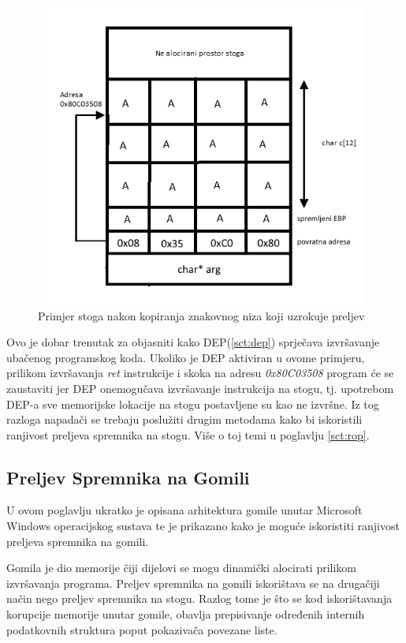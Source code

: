 \documentclass[times, utf8, diplomski, numeric]{fer}
\begin{document}
\begin{figure}[!ht]
\centering
\setlength\fboxsep{0pt}
\setlength\fboxrule{0.5pt}
\includegraphics[width=12cm, height=10cm]{slike/buffer_overflow_overflow}
\caption{Primjer stoga nakon kopiranja znakovnog niza koji uzrokuje preljev}
\label{fig:buff_overflow_overflow} 
\end{figure}
Ovo je dobar trenutak za objasniti kako DEP(\ref{sct:dep}) sprječava izvršavanje ubačenog programskog koda. Ukoliko je DEP aktiviran u ovome primjeru, prilikom izvršavanja \emph{ret} instrukcije i skoka na adresu \emph{0x80C03508} program će se zaustaviti jer DEP onemogučava izvršavanje instrukcija na stogu, tj. upotrebom DEP-a sve memorijske lokacije na stogu postavljene su kao ne izvršne. Iz tog razloga napadači se trebaju poslužiti drugim metodama kako bi iskoristili ranjivost preljeva spremnika na stogu. Više o toj temi u poglavlju \ref{sct:rop}.

\subsection{Preljev Spremnika na Gomili}
\label{scr:heap_overflow}
U ovom poglavlju ukratko je opisana arhitektura gomile unutar Microsoft Windows operacijskog sustava te je prikazano kako je moguće iskoristiti ranjivost preljeva spremnika na gomili.

Gomila je dio memorije čiji dijelovi se mogu dinamički alocirati prilikom izvršavanja programa. Preljev spremnika na gomili iskorištava se na drugačiji način nego preljev spremnika na stogu. Razlog tome je što se kod iskorištavanja korupcije memorije unutar gomile, obavlja prepisivanje određenih internih podatkovnih struktura poput pokazivača povezane liste.
\end{document}
